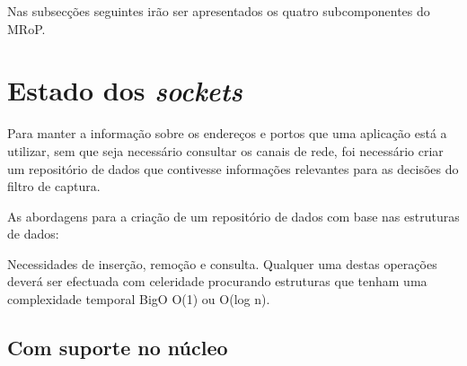 Nas subsecções seguintes irão ser apresentados os quatro subcomponentes do MRoP.


\section{Estado dos \textit{sockets}}

Para manter a informação sobre os endereços e portos que uma aplicação está a utilizar, sem que seja necessário consultar os canais de rede, foi necessário criar um repositório de dados que contivesse informações relevantes para as decisões do filtro de captura.

As abordagens para a criação de um repositório de dados com base nas estruturas de dados:

Necessidades de inserção, remoção e consulta. Qualquer uma destas operações deverá ser efectuada com celeridade procurando estruturas que tenham uma complexidade temporal BigO O(1) ou O(log n).

\subsection{Com suporte no núcleo}

